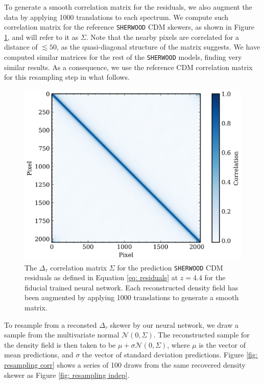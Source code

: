 To generate a smooth correlation matrix for the residuals, we also augment the data by applying 1000 translations to each spectrum. We compute such correlation matrix for the reference \texttt{SHERWOOD} CDM skewers, as shown in Figure \ref{fig: corr mat cdm}, and will refer to it as $\Sigma$. Note that the nearby pixels are correlated for a distance of $\lesssim 50$, as the quasi-diagonal structure of the matrix suggests. We have computed similar matrices for the rest of the \texttt{SHERWOOD} models, finding very similar results. As a consequence, we use the reference CDM correlation matrix for this resampling step in what follows.


\begin{figure}
    \centering
    \includegraphics[width=0.85\linewidth]{img/ML/cov_mat_imprs.png}
    \caption{The $\Delta_\tau$ correlation matrix $\Sigma$ for the prediction \texttt{SHERWOOD} CDM residuals as defined in Equation \ref{eq: residuals} at $z=4.4$ for the fiducial trained neural network. Each reconstructed density field has been augmented by applying 1000 translations to generate a smooth matrix.}
    \label{fig: corr mat cdm}
\end{figure}

To resample from a reconsted $\Delta_\tau$ skewer by our neural network, we draw a sample from the multivariate normal $\mathcal{N}(0,\Sigma)$. The reconstructed sample for the density field is then taken to be $\mu+\sigma \mathcal{N}(0,\Sigma)$, where $\mu$ is the vector of mean predictions, and $\sigma$ the vector of standard deviation predictions. Figure \ref{fig: resampling corr} shows a series of 100 draws from the same recovered density skewer as Figure \ref{fig: resampling indep}.

